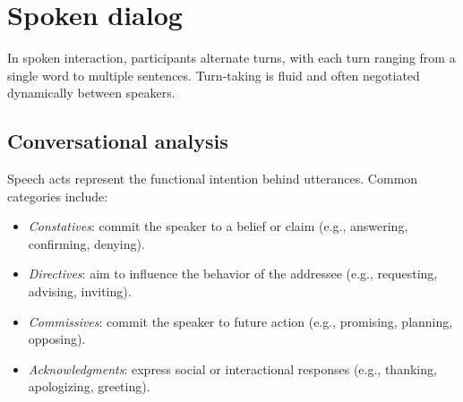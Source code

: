 \section{Spoken dialog}

In spoken interaction, participants alternate turns, with each turn ranging from a single word to multiple sentences. 
Turn-taking is fluid and often negotiated dynamically between speakers. 

\subsection{Conversational analysis}
Speech acts represent the functional intention behind utterances. 
Common categories include:
\begin{itemize}
    \item \textit{Constatives}: commit the speaker to a belief or claim (e.g., answering, confirming, denying).
    \item \textit{Directives}: aim to influence the behavior of the addressee (e.g., requesting, advising, inviting).
    \item \textit{Commissives}: commit the speaker to future action (e.g., promising, planning, opposing).
    \item \textit{Acknowledgments}: express social or interactional responses (e.g., thanking, apologizing, greeting).
\end{itemize}